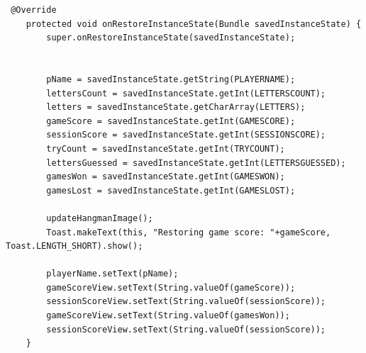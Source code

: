 \begin{lstlisting}
 @Override
    protected void onRestoreInstanceState(Bundle savedInstanceState) {
        super.onRestoreInstanceState(savedInstanceState);


        pName = savedInstanceState.getString(PLAYERNAME);
        lettersCount = savedInstanceState.getInt(LETTERSCOUNT);
        letters = savedInstanceState.getCharArray(LETTERS);
        gameScore = savedInstanceState.getInt(GAMESCORE);
        sessionScore = savedInstanceState.getInt(SESSIONSCORE);
        tryCount = savedInstanceState.getInt(TRYCOUNT);
        lettersGuessed = savedInstanceState.getInt(LETTERSGUESSED);
        gamesWon = savedInstanceState.getInt(GAMESWON);
        gamesLost = savedInstanceState.getInt(GAMESLOST);

        updateHangmanImage();
        Toast.makeText(this, "Restoring game score: "+gameScore, Toast.LENGTH_SHORT).show();

        playerName.setText(pName);
        gameScoreView.setText(String.valueOf(gameScore));
        sessionScoreView.setText(String.valueOf(sessionScore));
        gameScoreView.setText(String.valueOf(gamesWon));
        sessionScoreView.setText(String.valueOf(sessionScore));
    }
\end{lstlisting}


